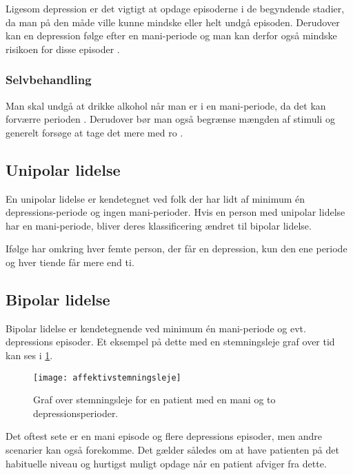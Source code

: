 Ligesom depression er det vigtigt at opdage episoderne i de begyndende stadier, da man på den måde ville kunne mindske eller helt undgå episoden.
Derudover kan en depression følge efter en mani-periode og man kan derfor også mindske risikoen for disse episoder \citep{misc:bipolarsundhed}.

\subsubsection{Selvbehandling}
Man skal undgå at drikke alkohol når man er i en mani-periode, da det kan forværre perioden \citep{misc:netpsykmani}.
Derudover bør man også begrænse mængden af stimuli og generelt forsøge at tage det mere med ro \citep{misc:janne-rasmussen}.

\subsection{Unipolar lidelse}
En unipolar lidelse er kendetegnet ved folk der har lidt af minimum én depressions-periode og ingen mani-perioder.
Hvis en person med unipolar lidelse har en mani-periode, bliver deres klassificering ændret til bipolar lidelse.

Ifølge \citet{misc:netpsykdepression} har omkring hver femte person, der får en depression, kun den ene periode og hver tiende får mere end ti.

\subsection{Bipolar lidelse}
Bipolar lidelse er kendetegnende ved minimum én mani-periode og evt. depressions episoder.
Et eksempel på dette med en stemningsleje graf over tid kan ses i \cref{fig:stemningslejegrafeksempel}.

\begin{figure}
	\centering
	\texttt{[image: affektivstemningsleje]}
	\caption{Graf over stemningsleje for en patient med en mani og to depressionsperioder.}\label{fig:stemningslejegrafeksempel}
\end{figure}

Det oftest sete er en mani episode og flere depressions episoder, men andre scenarier kan også forekomme.
Det gælder således om at have patienten på det habituelle niveau og hurtigst muligt opdage når en patient afviger fra dette.